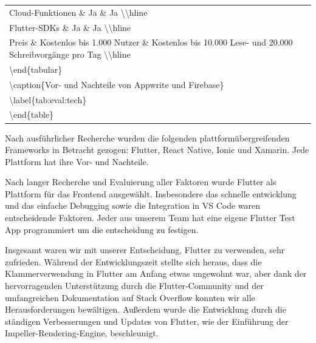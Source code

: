 \begin{table}[]
\begin{tabular}{l}
        Cloud-Funktionen   \& Ja                         \& Ja \textbackslash \textbackslash{}hline                                                                   \\
        Flutter-SDKs       \& Ja                         \& Ja \textbackslash \textbackslash{}hline                                                                   \\
        Preis              \& Kostenlos bis 1.000 Nutzer \& Kostenlos bis 10.000 Lese- und 20.000 Schreibvorgänge pro Tag \textbackslash \textbackslash{}hline        \\
        \textbackslash{}end\{tabular\}                                                                                                                                \\
        \textbackslash{}caption\{Vor- und Nachteile von Appwrite und Firebase\}                                                                                       \\
        \textbackslash{}label\{tab:eval:tech\}                                                                                                                        \\
        \textbackslash{}end\{table\}
    \end{tabular}
\end{table}

Nach ausführlicher Recherche wurden die folgenden plattformübergreifenden Frameworks in Betracht gezogen\cite{cross_platform_framework_comparison}: Flutter, React Native, Ionic und Xamarin. Jede Plattform hat ihre Vor- und Nachteile.

Nach langer Recherche und Evaluierung aller Faktoren wurde Flutter als Plattform für das Frontend ausgewählt. Insbesondere das schnelle entwicklung und das einfache Debugging sowie die Integration in VS Code waren entscheidende Faktoren. Jeder aus unserem Team hat eine eigene Flutter Test App programmiert \cite{flutter_test_apps} um die entscheidung zu festigen.

Insgesamt waren wir mit unserer Entscheidung, Flutter zu verwenden, sehr zufrieden. Während der Entwicklungszeit stellte sich heraus, dass die Klammerverwendung in Flutter am Anfang etwas ungewohnt war, aber dank der hervorragenden Unterstützung durch die Flutter-Community und der umfangreichen Dokumentation auf Stack Overflow konnten wir alle Herausforderungen bewältigen. Außerdem wurde die Entwicklung durch die ständigen Verbesserungen und Updates von Flutter, wie der Einführung der Impeller-Rendering-Engine, beschleunigt. \cite{flutter_impeller}

